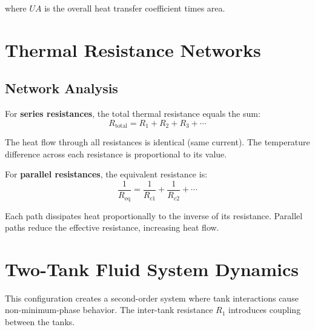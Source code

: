 where $UA$ is the overall heat transfer coefficient times area.

\section{Thermal Resistance Networks}
\label{sec:thermal_resistance_network}



\subsection{Network Analysis}

For \textbf{series resistances}, the total thermal resistance equals the sum:
\begin{equation}
R_{\text{total}} = R_1 + R_2 + R_3 + \cdots
\end{equation}

The heat flow through all resistances is identical (same current). The temperature difference across each resistance is proportional to its value.

For \textbf{parallel resistances}, the equivalent resistance is:
\begin{equation}
\frac{1}{R_{\text{eq}}} = \frac{1}{R_{c1}} + \frac{1}{R_{c2}} + \cdots
\end{equation}

Each path dissipates heat proportionally to the inverse of its resistance. Parallel paths reduce the effective resistance, increasing heat flow.

\section{Two-Tank Fluid System Dynamics}
\label{sec:two_tank_dynamics}



This configuration creates a second-order system where tank interactions cause non-minimum-phase behavior. The inter-tank resistance $R_1$ introduces coupling between the tanks.

